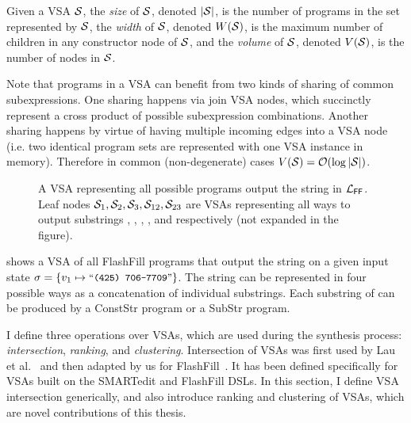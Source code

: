 \begin{defn}
    Given a VSA $\mathcal{S}$, the \emph{size} of $\mathcal{S}$, denoted $|\mathcal{S}|$, is the number of programs in the set
    represented by $\mathcal{S}$, the \emph{width} of $\mathcal{S}$, denoted $W(\mathcal{S})$, is the maximum number of children
    in any constructor node of $\mathcal{S}$, and the \emph{volume} of $\mathcal{S}$, denoted $V(\mathcal{S})$, is the number of nodes in $\mathcal{S}$.
\end{defn}

Note that programs in a VSA can benefit from two kinds of sharing of common subexpressions.
One sharing happens via join VSA nodes, which succinctly represent a cross product of possible subexpression combinations.
Another sharing happens by virtue of having multiple incoming edges into a VSA node (i.e. two identical program sets are represented
with one VSA instance in memory).
Therefore in common (non-degenerate) cases $V(\mathcal{S}) = \mathcal{O}(\log |\mathcal{S}|)$.

\begin{figure}[t]
    \centering
    
    \caption{A VSA representing all possible programs output the string  in $\mathcal{L}_{\mathsf{FF}}$.
    Leaf nodes $\mathcal{S}_1, \mathcal{S}_2, \mathcal{S}_3, \mathcal{S}_{12}, \mathcal{S}_{23}$ are VSAs representing all ways to output substrings
    , , , , and  respectively
    (not expanded in the figure).}
    \label{fig:ex:vsa}
\end{figure}

\begin{example}
     shows a VSA of all FlashFill programs that output the string  on a given input state
    $\state = \left\{ v_1 \mapsto \stringliteral{(425) 706-7709}\right\}$.
    The string  can be represented in four possible ways as a concatenation of individual substrings.
    Each substring of  can be produced by a \textsf{ConstStr} program or a \textsf{SubStr} program.
\end{example}

I define three operations over VSAs, which are used during the synthesis process: \emph{intersection},
\emph{ranking}, and \emph{clustering}.
Intersection of VSAs was first used by Lau et al.~\cite{lau:smartedit} and then adapted by us for FlashFill~\cite{flashfill}.
It has been defined specifically for VSAs built on the SMARTedit and FlashFill DSLs.
In this section, I define VSA intersection generically, and also introduce ranking and clustering of VSAs, which are
novel contributions of this thesis.

